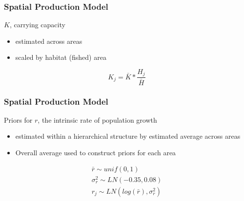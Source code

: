 \documentclass{beamer}
\begin{document}
\begin{frame}
\frametitle{Spatial Production Model}
$K$, carrying capacity

\begin{itemize}
    \item estimated across areas
    \item scaled by habitat (fished) area
\end{itemize}

\begin{equation*}
    K_j=\bar{K}*\frac{H_j}{\bar{H}}
 \end{equation*}

\end{frame}



\begin{frame}
\frametitle{Spatial Production Model}
Priors for $r$, the intrinsic rate of population growth

\begin{itemize}
    \item estimated within a hierarchical structure by estimated average across areas
    \item Overall average used to construct priors for each area
\end{itemize}

\begin{gather*}
    \bar{r} \sim {unif(0,1)}\\
    \sigma^2_r \sim {LN(-0.35,0.08)}\\
    r_j \sim {LN(log(\bar{r}),\sigma^2_r)}
 \end{gather*}
   

\end{frame}
\end{document}
